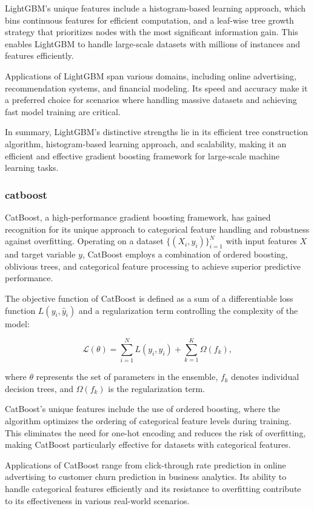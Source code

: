 \documentclass[twocolumn]{article}
\begin{document}
LightGBM's unique features include a histogram-based learning approach, which bins continuous features for efficient computation, and a leaf-wise tree growth strategy that prioritizes nodes with the most significant information gain. This enables LightGBM to handle large-scale datasets with millions of instances and features efficiently.

Applications of LightGBM span various domains, including online advertising, recommendation systems, and financial modeling. Its speed and accuracy make it a preferred choice for scenarios where handling massive datasets and achieving fast model training are critical.

In summary, LightGBM's distinctive strengths lie in its efficient tree construction algorithm, histogram-based learning approach, and scalability, making it an efficient and effective gradient boosting framework for large-scale machine learning tasks.

		\subsubsection{catboost}
CatBoost, a high-performance gradient boosting framework, has gained recognition for its unique approach to categorical feature handling and robustness against overfitting. Operating on a dataset \(\{(X_i, y_i)\}_{i=1}^{N}\) with input features \(X\) and target variable \(y\), CatBoost employs a combination of ordered boosting, oblivious trees, and categorical feature processing to achieve superior predictive performance.

The objective function of CatBoost is defined as a sum of a differentiable loss function \(L(y_i, \hat{y}_i)\) and a regularization term controlling the complexity of the model:

\[ \mathcal{L}(\theta) = \sum_{i=1}^{N} L(y_i, \hat{y}_i) + \sum_{k=1}^{K} \Omega(f_k), \]

where \(\theta\) represents the set of parameters in the ensemble, \(f_k\) denotes individual decision trees, and \(\Omega(f_k)\) is the regularization term.

CatBoost's unique features include the use of ordered boosting, where the algorithm optimizes the ordering of categorical feature levels during training. This eliminates the need for one-hot encoding and reduces the risk of overfitting, making CatBoost particularly effective for datasets with categorical features.

Applications of CatBoost range from click-through rate prediction in online advertising to customer churn prediction in business analytics. Its ability to handle categorical features efficiently and its resistance to overfitting contribute to its effectiveness in various real-world scenarios.
\end{document}
